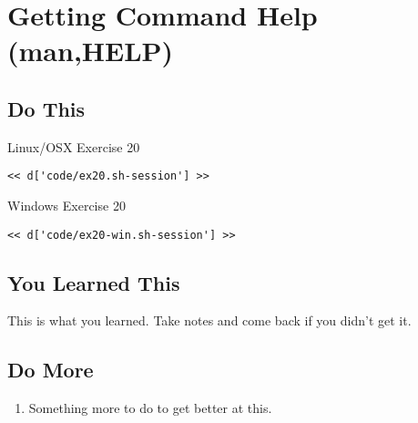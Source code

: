 \chapter{Getting Command Help (man,HELP)}

\section{Do This}

\begin{code}{Linux/OSX Exercise 20}
\begin{Verbatim}
<< d['code/ex20.sh-session'] >>
\end{Verbatim}
\end{code}

\begin{code}{Windows Exercise 20}
\begin{Verbatim}
<< d['code/ex20-win.sh-session'] >>
\end{Verbatim}
\end{code}

\section{You Learned This}

This is what you learned.  Take notes and come back if you didn't get it.

\section{Do More}

\begin{enumerate}
\item Something more to do to get better at this.
\end{enumerate}

